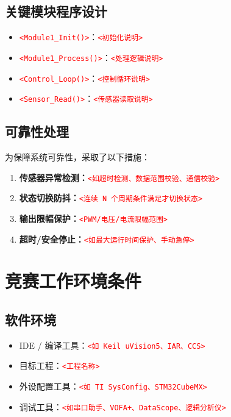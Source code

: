 \documentclass[12pt,a4paper,fontset=fandol]{ctexart}
\newcommand{\code}[1]{\texttt{\small #1}}
\newcommand{\placeholder}[1]{\textcolor{red}{\texttt{<#1>}}}
\begin{document}
\subsection{关键模块程序设计}
\begin{itemize}
  \item \code{\placeholder{Module1\_Init()}}：\placeholder{初始化说明}
  \item \code{\placeholder{Module1\_Process()}}：\placeholder{处理逻辑说明}
  \item \code{\placeholder{Control\_Loop()}}：\placeholder{控制循环说明}
  \item \code{\placeholder{Sensor\_Read()}}：\placeholder{传感器读取说明}
\end{itemize}

\subsection{可靠性处理}
为保障系统可靠性，采取了以下措施：
\begin{enumerate}
  \item \textbf{传感器异常检测：}\placeholder{如超时检测、数据范围校验、通信校验}
  \item \textbf{状态切换防抖：}\placeholder{连续 N 个周期条件满足才切换状态}
  \item \textbf{输出限幅保护：}\placeholder{PWM/电压/电流限幅范围}
  \item \textbf{超时/安全停止：}\placeholder{如最大运行时间保护、手动急停}
\end{enumerate}

\section{竞赛工作环境条件}

\subsection{软件环境}
\begin{itemize}
  \item IDE / 编译工具：\placeholder{如 Keil uVision5、IAR、CCS}
  \item 目标工程：\code{\placeholder{工程名称}}
  \item 外设配置工具：\placeholder{如 TI SysConfig、STM32CubeMX}
  \item 调试工具：\placeholder{如串口助手、VOFA+、DataScope、逻辑分析仪}
\end{itemize}
\end{document}
